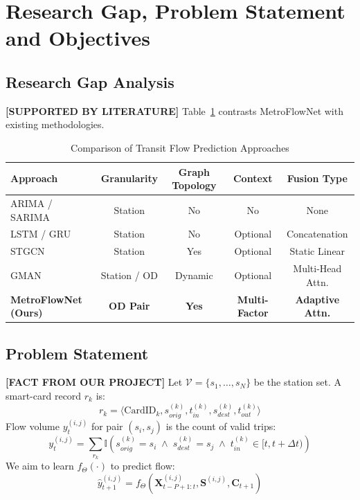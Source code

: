 \documentclass[conference]{IEEEtran}
\begin{document}
\section{Research Gap, Problem Statement and Objectives}
\label{sec:problem}

\subsection{Research Gap Analysis}
\noindent \textbf{[SUPPORTED BY LITERATURE]} Table~\ref{tab:lit_comparison} contrasts MetroFlowNet with existing methodologies.

\begin{table}[htbp]
\caption{Comparison of Transit Flow Prediction Approaches}
\label{tab:lit_comparison}
\centering
\begin{tabular}{lcccc}
\toprule
\textbf{Approach} & \textbf{Granularity} & \textbf{Graph Topology} & \textbf{Context} & \textbf{Fusion Type} \\
\midrule
ARIMA / SARIMA \cite{williams2003modeling} & Station & No & No & None \\
LSTM / GRU \cite{fu2016using} & Station & No & Optional & Concatenation \\
STGCN \cite{yu2018spatio} & Station & Yes & Optional & Static Linear \\
GMAN \cite{zheng2020gman} & Station / OD & Dynamic & Optional & Multi-Head Attn. \\
\textbf{MetroFlowNet (Ours)} & \textbf{OD Pair} & \textbf{Yes} & \textbf{Multi-Factor} & \textbf{Adaptive Attn.} \\
\bottomrule
\end{tabular}
\end{table}

\subsection{Problem Statement}
\noindent \textbf{[FACT FROM OUR PROJECT]} Let $\mathcal{V} = \{s_1, \dots, s_N\}$ be the station set. A smart-card record $r_k$ is:
\begin{equation}
r_k = \langle \text{CardID}_k, s_{orig}^{(k)}, t_{in}^{(k)}, s_{dest}^{(k)}, t_{out}^{(k)} \rangle
\end{equation}
Flow volume $y_t^{(i,j)}$ for pair $(s_i, s_j)$ is the count of valid trips:
\begin{equation}
y_t^{(i,j)} = \sum_{r_k} \mathbb{I}\left( s_{orig}^{(k)} = s_i \;\land\; s_{dest}^{(k)} = s_j \;\land\; t_{in}^{(k)} \in [t, t+\Delta t) \right)
\end{equation}
We aim to learn $f_\Theta(\cdot)$ to predict flow:
\begin{equation}
\hat{y}_{t+1}^{(i,j)} = f_\Theta\left( \mathbf{X}_{t-P+1:t}^{(i,j)}, \mathbf{S}^{(i,j)}, \mathbf{C}_{t+1} \right)
\end{equation}
\end{document}
